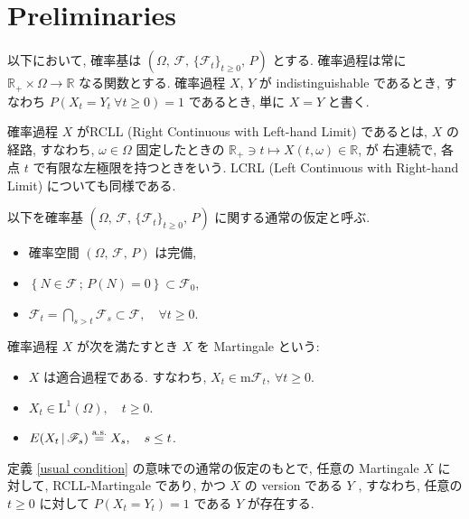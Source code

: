 \documentclass{ltjsarticle}
\begin{document}
\section{Preliminaries}
以下において, 確率基は \( ( \Omega,\, \mathscr{F},\, \{ \mathscr{F}_t \}_{ t \ge 0 } ,\, P ) \) とする.
確率過程は常に \( \mathbb{R}_{+} \times \Omega \to \mathbb{R} \) なる関数とする.
確率過程 \( X \), \( Y \) が indistinguishable であるとき, すなわち
\( P \left( X_t = Y_t \ \forall t \ge 0 \right) = 1 \) であるとき, 単に \( X = Y \) と書く.

確率過程 \( X \) がRCLL (Right Continuous with Left-hand Limit) であるとは,
\( X \) の経路, すなわち, \( \omega \in \Omega \) 固定したときの
\( \mathbb{R}_{+} \ni t \mapsto X(t, \omega) \in \mathbb{R} \),
が 右連続で, 各点 \( t \) で有限な左極限を持つときをいう. LCRL (Left Continuous with Right-hand Limit) についても同様である.


\begin{dfn}[通常の仮定] \label{usual condition}
	以下を確率基 \( ( \Omega,\, \mathscr{F},\, \{ \mathscr{F}_t \}_{ t \ge 0 } ,\, P ) \) に関する通常の仮定と呼ぶ.
	\begin{itemize}
		\item 確率空間 \( ( \Omega,\, \mathscr{F},\, P ) \) は完備,
		\item \( \left\{ N \in \mathscr{F} \,;\, P(N) = 0 \right\}
		      \subset \mathscr{F}_0 \),
		\item  \( \mathscr{F}_t	=	\bigcap_{ s > t } \mathscr{F}_s \subset \mathscr{F}, \quad \forall t \ge 0. \)
	\end{itemize}
\end{dfn}

\begin{dfn}[Martingale]	%
	確率過程 \( X \) が次を満たすとき \( X \) を Martingale という:
	\begin{itemize}
		\item 	\( X \) は適合過程である. すなわち,
		      \( X_t \in \mathrm{m}\mathscr{F}_t,\ \forall t \ge 0 \).
		\item	\( X_t \in \mathrm{L}^1 (\Omega), \quad t \ge 0 \).
		\item	\( E(X_t \, | \, \mathscr{F}_s) \stackrel{ \text{a.s.} }{ = } X_s, \quad s \le t \).
	\end{itemize}
\end{dfn}

\begin{thm}		\label{ReguMar}
	定義 \ref{usual condition} の意味での通常の仮定のもとで, 任意の  Martingale \( X \) に対して, RCLL-Martingale であり,
	かつ \( X \) の version である \( Y \) , すなわち, 任意の \( t \ge 0 \) に対して
	\( P \left( X_t = Y_t \right) =1 \)
	である \( Y \) が存在する.
\end{thm}
\end{document}
